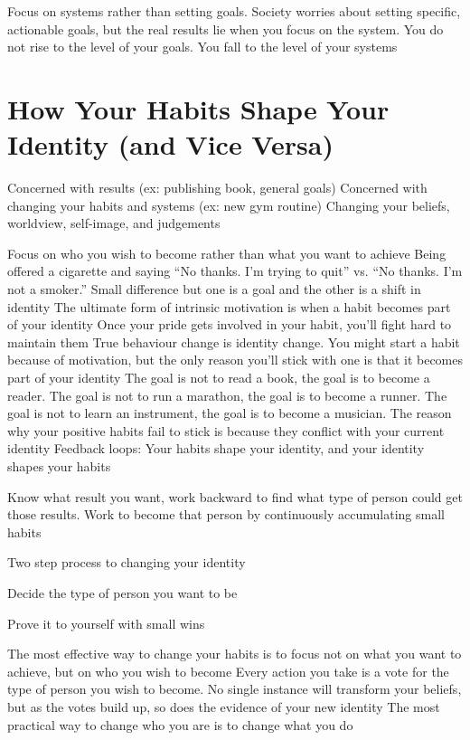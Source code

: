 \documentclass[10pt,twocolumn]{../notes}
\begin{document}
\Advice Focus on systems rather than setting goals.
\Fact Society worries about setting specific, actionable goals, but the real results lie when you focus on the system.
\Quote You do not rise to the level of your goals. You fall to the level of your systems

\section{How Your Habits Shape Your Identity (and Vice Versa)}
 Concerned with results (ex: publishing book, general goals)
 Concerned with changing your habits and systems (ex: new gym routine)
 Changing your beliefs, worldview, self-image, and judgements

\Advice Focus on who you wish to become rather than what you want to achieve
\Example Being offered a cigarette and saying “No thanks. I’m trying to quit” vs. “No thanks. I’m not a smoker.” Small difference but one is a goal and the other is a shift in identity
\Quote The ultimate form of intrinsic motivation is when a habit becomes part of your identity
\Fact Once your pride gets involved in your habit, you’ll fight hard to maintain them
\Quote True behaviour change is identity change. You might start a habit because of motivation, but the only reason you’ll stick with one is that it becomes part of your identity
\Example The goal is not to read a book, the goal is to become a reader.
\Example The goal is not to run a marathon, the goal is to become a runner.
\Example The goal is not to learn an instrument, the goal is to become a musician.
\Fact The reason why your positive habits fail to stick is because they conflict with your current identity
\Fact Feedback loops: Your habits shape your identity, and your identity shapes your habits

\Advice Know what result you want, work backward to find what type of person could get those results. Work to become that person by continuously accumulating small habits
\begin{Olist}{Two step process to changing your identity}
  \item Decide the type of person you want to be
  \item Prove it to yourself with small wins
\end{Olist}
\Quote The most effective way to change your habits is to focus not on what you want to achieve, but on who you wish to become
\Quote Every action you take is a vote for the type of person you wish to become. No single instance will transform your beliefs, but as the votes build up, so does the evidence of your new identity
\Quote The most practical way to change who you are is to change what you do
\end{document}

